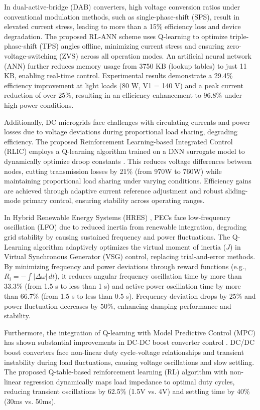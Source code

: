In dual-active-bridge (DAB) converters, high voltage conversion ratios under conventional modulation methods, such as single-phase-shift (SPS), result in elevated current stress, leading to more than a 15\% efficiency loss and device degradation. The proposed RL-ANN scheme uses Q-learning to optimize triple-phase-shift (TPS) angles offline, minimizing current stress and ensuring zero-voltage-switching (ZVS) across all operation modes. An artificial neural network (ANN) further reduces memory usage from 3750 KB (lookup tables) to just 11 KB, enabling real-time control. Experimental results demonstrate a 29.4\% efficiency improvement at light loads (80 W, V1 = 140 V) and a peak current reduction of over 25\%, resulting in an efficiency enhancement to 96.8\% under high-power conditions.

Additionally, DC microgrids face challenges with circulating currents and power losses due to voltage deviations during proportional load sharing, degrading efficiency. The proposed Reinforcement Learning-based Integrated Control (RLIC) employs a Q-learning algorithm trained on a DNN surrogate model to dynamically optimize droop constants \cite{chaturvedi2023reinforcement}. This reduces voltage differences between nodes, cutting transmission losses by 21\% (from 970W to 760W) while maintaining proportional load sharing under varying conditions. Efficiency gains are achieved through adaptive current reference adjustment and robust sliding-mode primary control, ensuring stability across operating ranges.

In Hybrid Renewable Energy Systems (HRES) \cite{tang2020reinforcement}, PECs face low-frequency oscillation (LFO) due to reduced inertia from renewable integration, degrading grid stability by causing sustained frequency and power fluctuations. The Q-Learning algorithm adaptively optimizes the virtual moment of inertia (\(J\)) in Virtual Synchronous Generator (VSG) control, replacing trial-and-error methods. By minimizing frequency and power deviations through reward functions (e.g., \(R_i = -\int |\Delta \omega| \, dt\)), it reduces angular frequency oscillation time by more than 33.3\% (from 1.5 s to less than 1 s) and active power oscillation time by more than 66.7\% (from 1.5 s to less than 0.5 s). Frequency deviation drops by 25\% and power fluctuation decreases by 50\%, enhancing damping performance and stability.

Furthermore, the integration of Q-learning with Model Predictive Control (MPC) has shown substantial improvements in DC-DC boost converter control \cite{marahatta2022model}. DC/DC boost converters face non-linear duty cycle-voltage relationships and transient instability during load fluctuations, causing voltage oscillations and slow settling. The proposed Q-table-based reinforcement learning (RL) algorithm with non-linear regression dynamically maps load impedance to optimal duty cycles, reducing transient oscillations by 62.5\% (1.5V vs. 4V) and settling time by 40\% (30ms vs. 50ms). 


